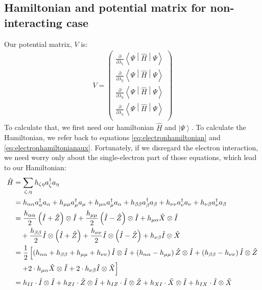 \documentclass{aux/ttuthes2007}
\newcommand{\ket}[1]{\ensuremath{\left|#1\right\rangle}}
\newcommand{\sandwich}[3]{\left< #1 \middle\vert #2 \middle\vert #3 \right>}
\newcommand{\paren}[1]{\left( #1 \right)}
\newcommand{\pd}[1]{\frac{\partial}{\partial #1}}
\newcommand{\anio}[1]{a_{\oo{#1}}}
\newcommand{\aniu}[1]{a_{\uo{#1}}}
\newcommand{\anig}[1]{a_{\go{#1}}}
\newcommand{\creo}[1]{a^\dagger_{\oo{#1}}}
\newcommand{\creu}[1]{a^\dagger_{\uo{#1}}}
\newcommand{\creg}[1]{a^\dagger_{\go{#1}}}
\newcommand{\uo}[1]{
		\IfEqCase{#1}{
			{0}{\mu}
			{1}{\nu}
			{2}{\xi}
		}[\PackageError{uo}{Undefined option to uo: #1}{}]
}
\newcommand{\oo}[1]{
		\IfEqCase{#1}{
			{0}{\alpha}
			{1}{\beta}
			{2}{\gamma}
		}[\PackageError{unocorb}{Undefined option to unuo: #1}{}]
}
\newcommand{\go}[1]{
		\IfEqCase{#1}{
			{0}{\zeta}
			{1}{\eta}
			{2}{\iota}
			{3}{\kappa}
		}[\PackageError{unocorb}{Undefined option to go: #1}{}]
}
\begin{document}
\subsection{\textbf{Hamiltonian and potential matrix for non-interacting case}}

Our potential matrix, $V$ is:
%
\begin{equation*}
	\begin{split}
		V = \begin{pmatrix}
			\pd {\lambda_1} \sandwich {\Psi}{\hat H}{\Psi}\\
			\pd {\lambda_2} \sandwich {\Psi}{\hat H}{\Psi}\\
			\pd {\lambda_3} \sandwich {\Psi}{\hat H}{\Psi}\\
			\pd {\lambda_4} \sandwich {\Psi}{\hat H}{\Psi}\\
		\end{pmatrix}
	\end{split}
\end{equation*}
%
To calculate that, we first need our hamiltonian $\hat H$ and $\ket \Psi$. To calculate the Hamiltonian, we refer back to equations \ref{eq:electronhamiltonian} and \ref{eq:electronhamiltonianaux}. Fortunately, if we disregard the electron interaction, we need worry only about the single-electron part of those equations, which lead to our Hamiltonian:
%
\begin{equation*}
	\begin{split}
	\hat H  &= \sum_{\go 0, \go 1}h_{\go 0 \go 1}\creg 0 \anig 1 \\
		&= {h_{\alpha\alpha}} \creo 0 \anio 0
		+ {h_{\mu\mu}} \creu 0 \aniu 0
		+ h_{\mu\alpha} \creu 0 \anio 0 
		+ {h_{\beta\beta}} \creo 1 \anio 1
		+ {h_{\nu\nu}} \creu 1 \aniu 1
		+ h_{\nu\beta} \creu 1 \anio 1
%
		\\
%
		&= \frac{h_{\alpha\alpha}}{2} \paren{\hat I + \hat Z} \otimes \hat I
		+ \frac{h_{\mu\mu}}{2} \paren{\hat I - \hat Z} \otimes \hat I
		+ h_{\mu\alpha} \hat X \otimes \hat I 
%
		\\
%
		& \quad
		+ \frac{h_{\beta\beta}}{2} \hat I \otimes \paren{\hat I + \hat Z} 
		+ \frac{h_{\nu\nu}}{2} \hat I \otimes \paren{\hat I - \hat Z} 
		+ h_{\nu\beta} \hat I \otimes \hat X
%
	\\
%
		&= 	\frac{1}{2} \left[ 
			\paren{h_{\alpha\alpha} + h_{\beta\beta} + h_{\mu\mu} + h_{\nu\nu}} \hat I \otimes \hat I 
		+	\paren{h_{\alpha\alpha} - h_{\mu\mu}} \hat Z \otimes \hat I 
		+	\paren{h_{\beta\beta} - h_{\nu\nu}} \hat I \otimes \hat Z 
	\right .
	\\
		& \quad	\left .
		+ 	2 \cdot h_{\mu\alpha} \hat X \otimes \hat I 
		+ 	2 \cdot h_{\nu\beta} \hat I \otimes \hat X
	\right]
%
	\\
%
		&=	h_{II} \cdot \hat I \otimes \hat I
		+	h_{ZI} \cdot \hat Z \otimes \hat I
		+	h_{IZ} \cdot \hat I \otimes \hat Z
		+	h_{XI} \cdot \hat X \otimes \hat I
		+	h_{IX} \cdot \hat I \otimes \hat X
	\end{split}
\end{equation*}
\end{document}
